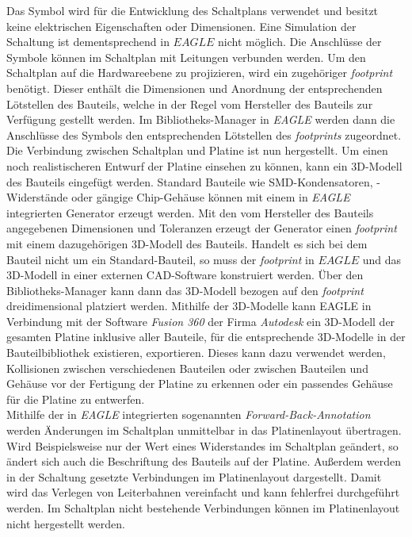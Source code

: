 Das Symbol wird für die Entwicklung des Schaltplans verwendet und besitzt keine elektrischen Eigenschaften oder Dimensionen. Eine Simulation der Schaltung ist dementsprechend in $EAGLE$ nicht möglich. Die Anschlüsse der Symbole können im Schaltplan mit Leitungen verbunden werden. Um den Schaltplan auf die Hardwareebene zu projizieren, wird ein zugehöriger \textit{footprint} benötigt. Dieser enthält die Dimensionen und Anordnung der entsprechenden Lötstellen des Bauteils, welche in der Regel vom Hersteller des Bauteils zur Verfügung gestellt werden. Im Bibliotheks-Manager in \textit{EAGLE} werden dann die Anschlüsse des Symbols den entsprechenden Lötstellen des \textit{footprints} zugeordnet. Die Verbindung zwischen Schaltplan und Platine ist nun hergestellt. Um  einen noch realistischeren Entwurf der Platine einsehen zu können, kann ein 3D-Modell des Bauteils eingefügt werden. Standard Bauteile wie SMD-Kondensatoren, -Widerstände oder gängige Chip-Gehäuse können mit einem in \textit{EAGLE} integrierten Generator erzeugt werden. Mit den vom Hersteller des Bauteils angegebenen Dimensionen und Toleranzen erzeugt der Generator einen \textit{footprint} mit einem dazugehörigen 3D-Modell des Bauteils. Handelt es sich bei dem Bauteil nicht um ein Standard-Bauteil, so muss der \textit{footprint} in $EAGLE$ und das 3D-Modell in einer externen CAD-Software konstruiert werden. Über den Bibliotheks-Manager kann dann das 3D-Modell bezogen auf den \textit{footprint} dreidimensional platziert werden. Mithilfe der 3D-Modelle kann EAGLE in Verbindung mit der Software \textit{Fusion 360} der Firma \textit{Autodesk} ein 3D-Modell der gesamten Platine inklusive aller Bauteile, für die entsprechende 3D-Modelle in der Bauteilbibliothek existieren, exportieren. Dieses kann dazu verwendet werden, Kollisionen zwischen verschiedenen Bauteilen oder zwischen Bauteilen und Gehäuse vor der Fertigung der Platine zu erkennen oder ein passendes Gehäuse für die Platine zu entwerfen.\\
Mithilfe der in \textit{EAGLE} integrierten sogenannten \textit{Forward-Back-Annotation} werden Änderungen im Schaltplan unmittelbar in das Platinenlayout übertragen. Wird Beispielsweise nur der Wert eines Widerstandes im Schaltplan geändert, so ändert sich auch die Beschriftung des Bauteils auf der Platine. Außerdem werden in der Schaltung gesetzte Verbindungen im Platinenlayout dargestellt. Damit wird das Verlegen von Leiterbahnen vereinfacht und kann fehlerfrei durchgeführt werden. Im Schaltplan nicht bestehende Verbindungen können im Platinenlayout nicht hergestellt werden.
